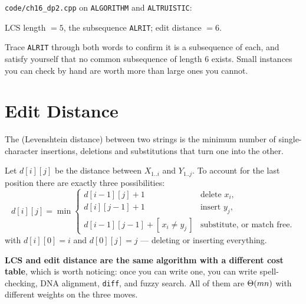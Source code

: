 \begin{worked}
\texttt{code/ch16\_dp2.cpp} on \texttt{ALGORITHM} and \texttt{ALTRUISTIC}:
\begin{center}
LCS length $= 5$, the subsequence \texttt{ALRIT};\qquad
edit distance $= 6$.
\end{center}
Trace \texttt{ALRIT} through both words to confirm it is a subsequence of each,
and satisfy yourself that no common subsequence of length 6 exists. Small
instances you can check by hand are worth more than large ones you cannot.
\end{worked}

\section{Edit Distance}

\begin{definitionbox}
The  (Levenshtein distance) between two strings is the
minimum number of single-character insertions, deletions and substitutions that
turn one into the other.
\end{definitionbox}

\begin{conceptbox}
Let $d[i][j]$ be the distance between $X_{1..i}$ and $Y_{1..j}$. To account for
the last position there are exactly three possibilities:
\[ d[i][j] = \min\begin{cases}
   d[i-1][j] + 1 & \text{delete } x_{i}, \\
   d[i][j-1] + 1 & \text{insert } y_{j}, \\
   d[i-1][j-1] + [\,x_{i} \ne y_{j}\,] & \text{substitute, or match free.}
   \end{cases} \]
with $d[i][0] = i$ and $d[0][j] = j$ --- deleting or inserting everything.

\smallskip
\textbf{LCS and edit distance are the same algorithm with a different cost
table}, which is worth noticing: once you can write one, you can write
spell-checking, DNA alignment, \texttt{diff}, and fuzzy search. All of them are
$\Theta(mn)$ with different weights on the three moves.
\end{conceptbox}

